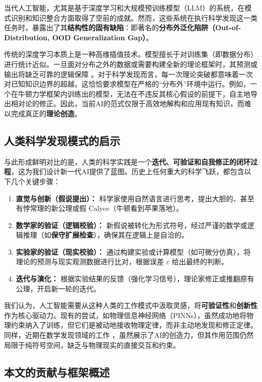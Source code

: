 \documentclass[11pt, a4paper]{article}
\begin{document}
当代人工智能，尤其是基于深度学习和大规模预训练模型（LLM）的系统，在模式识别和知识整合方面取得了空前的成就。然而，这些系统在执行科学发现这一类任务时，暴露出了其\textbf{结构性的固有缺陷}：即著名的\textbf{分布外泛化陷阱（Out-of-Distribution, OOD Generalization Gap）}。

传统的深度学习本质上是一种高维插值技术。模型擅长于对训练集（即数据分布）进行统计近似。一旦面对分布之外的数据或需要构建全新的理论框架时，其预测或输出将缺乏可靠的逻辑保障 \cite{garcez2019neural}。对于科学发现而言，每一次理论突破都意味着一次对已知知识边界的超越，这恰恰要求模型在严格的“分布外”环境中运行。例如，一个在牛顿力学框架内训练出的模型，无法在不违反其核心假设的前提下，自主地导出相对论的修正。因此，当前AI的范式仅限于高效地解构和应用现有知识，而难以完成真正的\textbf{理论创造}。

\subsection{人类科学发现模式的启示}

与此形成鲜明对比的是，人类的科学实践是一个\textbf{迭代、可验证和自我修正的闭环过程}，这为我们设计新一代AI提供了蓝图。历史上任何重大的科学飞跃，都包含以下几个关键步骤：

\begin{enumerate}
	\item \textbf{直觉与创新（假说提出）：} 科学家使用自然语言进行思考，提出大胆的、甚至有悖常理的新公理或假 Calyce（牛顿看到苹果落地）。
	\item \textbf{数学家的验证（逻辑校验）：} 新假说被转化为形式符号，经过严谨的数学或逻辑推理（如\textbf{保守扩展检查}），确保其在逻辑上是自洽的。
	\item \textbf{实验家的验证（现实校验）：} 通过构建实验或计算模型（如可微分仿真），将理论的预测与现实观测数据进行比对，根据误差 $\varepsilon$ 给出最终的判断。
	\item \textbf{迭代与演化：} 根据实验结果的反馈（强化学习信号），理论家修正或推翻原有公理，开启新一轮的迭代。
\end{enumerate}

我们认为，人工智能需要从这种人类的工作模式中汲取灵感，将\textbf{可验证性}和\textbf{创新性}作为核心驱动力。现有的尝试，如物理信息神经网络（PINNs）\cite{raissi2019pinns}，虽然成功地将物理约束纳入了训练，但它们是被动地接收物理定律，而非主动地发现和修正定律。同样，近期在数学发现领域的工作 \cite{fawzi2022discovering}，虽然展示了AI的创造力，但其作用范围仍然局限于纯符号空间，缺乏与物理现实的直接交互和约束。

\subsection{本文的贡献与框架概述}
\end{document}
